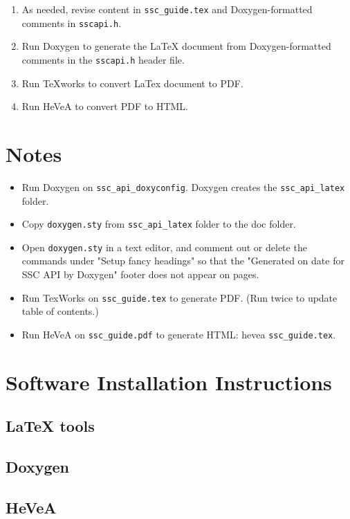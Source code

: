 \documentclass{article}
\begin{document}
\begin{enumerate}

\item As needed, revise content in \texttt{ssc\_guide.tex} and Doxygen-formatted comments in \texttt{sscapi.h}.

\item Run Doxygen to generate the LaTeX document from Doxygen-formatted comments in the \texttt{sscapi.h} header file.

\item Run TeXworks to convert LaTex document to PDF.

\item Run HeVeA to convert PDF to HTML.

\end{enumerate}

\section{Notes}

\begin{itemize}

\item Run Doxygen on \texttt{ssc\_api\_doxyconfig}. Doxygen creates the \texttt{ssc\_api\_latex} folder.

\item Copy \texttt{doxygen.sty} from \texttt{ssc\_api\_latex} folder to the doc folder.

\item Open \texttt{doxygen.sty} in a text editor, and comment out or delete the commands under "Setup fancy headings" so that the "Generated on date for SSC API by Doxygen" footer does not appear on pages.

\item Run TexWorks on \texttt{ssc\_guide.tex} to generate PDF. (Run twice to update table of contents.)

\item Run HeVeA on \texttt{ssc\_guide.pdf} to generate HTML: hevea \texttt{ssc\_guide.tex}.

\end{itemize}
\section{Software Installation Instructions}


\subsection{LaTeX tools}

\subsection{Doxygen}

\subsection{HeVeA}
\end{document}
